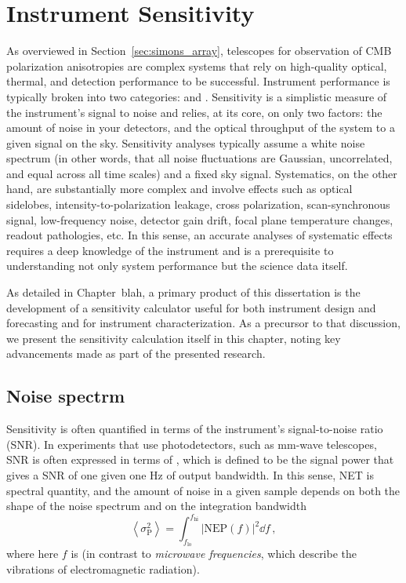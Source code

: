 \chapter{Instrument Sensitivity}
\label{ch:cmb_instrument_sensitivity}

As overviewed in Section~\ref{sec:simons_array}, telescopes for observation of CMB polarization anisotropies are complex systems that rely on high-quality optical, thermal, and detection performance to be successful. Instrument performance is typically broken into two categories:  and . Sensitivity is a simplistic measure of the instrument's signal to noise and relies, at its core, on only two factors: the amount of noise in your detectors, and the optical throughput of the system to a given signal on the sky. Sensitivity analyses typically assume a white noise spectrum (in other words, that all noise fluctuations are Gaussian, uncorrelated, and equal across all time scales) and a fixed sky signal. Systematics, on the other hand, are substantially more complex and involve effects such as optical sidelobes, intensity-to-polarization leakage, cross polarization, scan-synchronous signal, low-frequency noise, detector gain drift, focal plane temperature changes, readout pathologies, etc. In this sense, an accurate analyses of systematic effects requires a deep knowledge of the instrument and is a prerequisite to understanding not only system performance but the science data itself.

As detailed in Chapter~blah, a primary product of this dissertation is the development of a sensitivity calculator useful for both instrument design and forecasting and for instrument characterization. As a precursor to that discussion, we present the sensitivity calculation itself in this chapter, noting key advancements made as part of the presented research.


\section{Noise spectrm}
\label{sec:sensitivity_noise_spectrum}

Sensitivity is often quantified in terms of the instrument's signal-to-noise ratio (SNR). In experiments that use photodetectors, such as mm-wave telescopes, SNR is often expressed in terms of , which is defined to be the signal power that gives a SNR of one given one Hz of output bandwidth. In this sense, NET is spectral quantity, and the amount of noise in a given sample depends on both the shape of the noise spectrum and on the integration bandwidth
\begin{equation}
    \left< \sigma_{\mathrm{P}}^{2} \right> = \int_{f_{\mathrm{lo}}}^{f_{\mathrm{hi}}} \left| \mathrm{NEP}(f) \right|^{2} \dd f \, ,
    \label{eq:net_spectrum_integrate}
\end{equation}
where here $f$ is  (in contrast to \textit{microwave frequencies}, which describe the vibrations of electromagnetic radiation).

